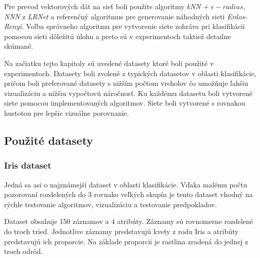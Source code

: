 \documentclass[slovak,master,dept460,male,cpp,cpdeclaration]{diploma}
\begin{document}
Pre prevod vektorových dát na sieť boli použite algoritmy \textit{kNN + $\epsilon-radius$}, \textit{NNN} z \textit{LRNet} a referenčný algoritmus pre generovanie náhodných sieti \textit{Erdos-Renyi}. Voľba správneho algoritmu pre vytvorenie siete zohráva pri klasifikácii pomocou sieti dôležitú úlohu a preto sú v experimentoch taktiež detailne skúmané. 

Na začiatku tejto kapitoly sú uvedené datasety ktoré boli použité v experimentoch. Datasety boli zvolené z typických datasetov v oblasti klasifikácie, pričom boli preferované datasety s nižším počtom vrcholov čo umožňuje ľahšiu vizualizáciu a nižšiu vypočtovú náročnosť.  Ku každému datasetu boli vytvorené siete pomocou implementovaných algoritmov. Siete boli vytvorené s rovnakou hustotou pre lepšie vizuálne porovnanie.

\subsection{Použité datasety}\label{used_dataset}

\subsubsection{Iris dataset}
Jedná sa asi o najznámejší dataset v oblasti klasifikácie. Vďaka malému počtu pozorovaní rozdelených do 3 rovnako veľkých skupín je tento dataset vhodný na rýchle testovanie algoritmov, vizualizáciu a testovanie predpokladov.

Dataset obsahuje 150 záznamov a 4 atribúty. Záznamy sú rovnomerne rozdelené do troch tried. Jednotlive záznamy predstavujú kvety z rodu Iris a atribúty predstavujú ich proporcie. Na základe proporcii je rastlina zradená do jednej z troch odrôd.\cite{iris}
\end{document}
